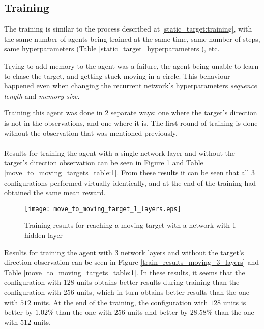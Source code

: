 \subsection{Training} \label{moving_target:training}
The training is similar to the process described at \ref{static_target:training}, with the same number of agents being trained at the same time, same number of steps, same hyperparameters (Table \ref{static_target_hyperparameters}), etc. 

Trying to add memory to the agent was a failure, the agent being unable to learn to chase the target, and getting stuck moving in a circle. This behaviour happened even when changing the recurrent network's hyperparameters \emph{sequence length} and \emph{memory size}. 

Training this agent was done in 2 separate ways: one where the target's direction is not in the observations, and one where it is. The first round of training is done without the observation that was mentioned previously.

\paragraph{}
Results for training the agent with a single network layer and without the target's direction observation can be seen in Figure \ref{train_results_moving_1_layers} and Table \ref{move_to_moving_targets_table:1}. From these results it can be seen that all 3 configurations performed virtually identically, and at the end of the training had obtained the same mean reward.

\begin{figure}
    \begin{center}
        \texttt{[image: move\_to\_moving\_target\_1\_layers.eps]}
        \caption{Training results for reaching a moving target with a network with 1 hidden layer}
        \label{train_results_moving_1_layers}
    \end{center}
\end{figure}


Results for training the agent with 3 network layers and without the target's direction observation can be seen in Figure \ref{train_results_moving_3_layers} and Table \ref{move_to_moving_targets_table:1}. In these results, it seems that the configuration with $128$ units obtains better results during training than the configuration with $256$ units, which in turn obtains better results than the one with $512$ units. At the end of the training, the configuration with $128$ units is better by $1.02\%$ than the one with $256$ units and better by $28.58\%$ than the one with $512$ units.


